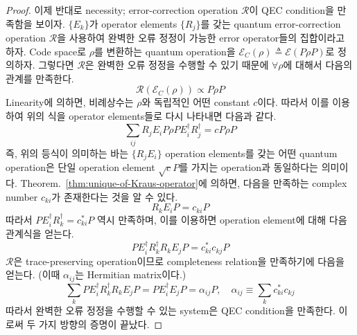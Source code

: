 \begin{proof}
    이제 반대로 necessity; error-correction operation $\mathcal R$이 QEC condition을 만족함을 보이자. $\{E_k\}$가 operator elements $\{R_j\}$를 갖는 quantum error-correction operation $\mathcal R$을 사용하여 완벽한 오류 정정이 가능한 error operator들의 집합이라고 하자.
    Code space로 $\rho$를 변환하는 quantum operation을 $\mathcal E_C(\rho) \triangleq \mathcal E(P \rho P)$로 정의하자. 그렇다면 $\mathcal R$은 완벽한 오류 정정을 수행할 수 있기 때문에 $\forall \rho$에 대해서 다음의 관계를 만족한다.
    \begin{equation*}
        \mathcal{R}\left(\mathcal{E}_C(\rho)\right) \propto P \rho P
    \end{equation*}
    Linearity에 의하면, 비례상수는 $\rho$와 독립적인 어떤 constant $c$이다. 따라서 이를 이용하여 위의 식을 operator elements들로 다시 나타내면 다음과 같다.
    \begin{equation*}
        \sum_{i j} R_j E_i P \rho P E_i^{\dagger} R_j^{\dagger}=c P \rho P
    \end{equation*}
    즉, 위의 등식이 의미하는 바는 $\{R_jE_i\}$ operation elements를 갖는 어떤 quantum operation은 단일 operation element $\sqrt c P$를 가지는 operation과 동일하다는 의미이다. Theorem.~\ref{thm:unique-of-Kraus-operator}에 의하면, 다음을 만족하는 complex number $c_{ki}$가 존재한다는 것을 알 수 있다.
    \begin{equation*}
        R_k E_i P=c_{k i} P
    \end{equation*}
    따라서 $P E_i^{\dagger} R_k^{\dagger}=c_{k i}^* P$ 역시 만족하며, 이를 이용하면 operation element에 대해 다음 관계식을 얻는다.
    \begin{equation*}
        P E_i^{\dagger} R_k^{\dagger} R_k E_j P=c_{k i}^* c_{k j} P
    \end{equation*}
    $\mathcal R$은 trace-preserving operation이므로 completeness relation을 만족하기에 다음을 얻는다. (이때 $\alpha_{ij}$는 Hermitian matrix이다.)
    \begin{equation*}
        \sum_k P E_i^{\dagger} R_k^{\dagger} R_k E_j P = P E_i^{\dagger} E_j P=\alpha_{i j} P, \quad \alpha_{i j} \equiv \sum_k c_{k i}^* c_{k j}
    \end{equation*}
    따라서 완벽한 오류 정정을 수행할 수 있는 system은 QEC condition을 만족한다. 이로써 두 가지 방향의 증명이 끝났다.
\end{proof}



